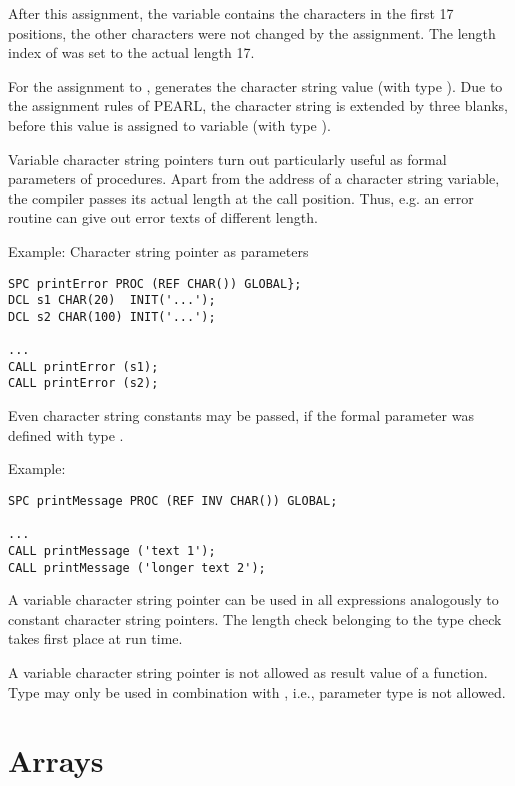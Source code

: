 After this assignment, the variable  contains the characters
 in the first 17 positions, the other characters
were not changed by the assignment. The length index of  was
set to the actual length 17.


For the  assignment to ,  generates
 the character string
value  (with type ).
 Due to the assignment
rules of PEARL, the character string is extended by three blanks, before
this value is assigned to variable  (with type ).

Variable character string pointers turn out particularly useful as
formal parameters of procedures. Apart from the address of a character
string variable, the compiler passes its actual length at the call
position.  Thus, e.g. an error routine can give out error texts of
different length.

Example: Character string pointer as parameters

\begin{lstlisting}
SPC printError PROC (REF CHAR()) GLOBAL};
DCL s1 CHAR(20)  INIT('...');
DCL s2 CHAR(100) INIT('...');

...
CALL printError (s1);
CALL printError (s2);
\end{lstlisting}

Even character string constants may be passed, if the formal parameter
was defined with type .

Example:

\begin{lstlisting}
SPC printMessage PROC (REF INV CHAR()) GLOBAL;

...
CALL printMessage ('text 1');
CALL printMessage ('longer text 2');
\end{lstlisting}

A variable character string pointer can be used in all expressions
analogously to constant character string pointers. The length check
belonging to the type check takes first place at run time.

A variable character string pointer is not allowed as result value of a
function. Type  may only be used in combination with ,
i.e., parameter type  is not allowed.

\section{Arrays}   %
\label{sec_array}


